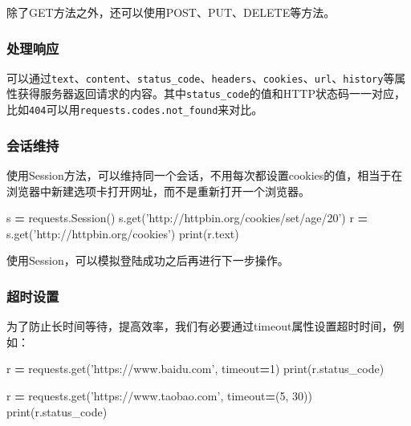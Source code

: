 \documentclass[]{ctexbook}
\newenvironment{Shaded}{\begin{snugshade}}{\end{snugshade}}
\newcommand{\BuiltInTok}[1]{#1}
\newcommand{\DecValTok}[1]{\textcolor[rgb]{0.00,0.00,0.81}{#1}}
\newcommand{\NormalTok}[1]{#1}
\newcommand{\OperatorTok}[1]{\textcolor[rgb]{0.81,0.36,0.00}{\textbf{#1}}}
\newcommand{\StringTok}[1]{\textcolor[rgb]{0.31,0.60,0.02}{#1}}
\begin{document}
除了GET方法之外，还可以使用POST、PUT、DELETE等方法。

\hypertarget{ux5904ux7406ux54cdux5e94}{%
\subsubsection{处理响应}\label{ux5904ux7406ux54cdux5e94}}

可以通过\texttt{text}、\texttt{content}、\texttt{status\_code}、\texttt{headers}、\texttt{cookies}、\texttt{url}、\texttt{history}等属性获得服务器返回请求的内容。其中\texttt{status\_code}的值和HTTP状态码一一对应，比如\texttt{404}可以用\texttt{requests.codes.not\_found}来对比。

\hypertarget{ux4f1aux8bddux7ef4ux6301}{%
\subsubsection{会话维持}\label{ux4f1aux8bddux7ef4ux6301}}

使用Session方法，可以维持同一个会话，不用每次都设置cookies的值，相当于在浏览器中新建选项卡打开网址，而不是重新打开一个浏览器。

\begin{Shaded}
\begin{Highlighting}[]
\NormalTok{s }\OperatorTok{=}\NormalTok{ requests.Session()}
\NormalTok{s.get(}\StringTok{'http://httpbin.org/cookies/set/age/20'}\NormalTok{)}
\NormalTok{r }\OperatorTok{=}\NormalTok{ s.get(}\StringTok{'http://httpbin.org/cookies'}\NormalTok{)}
\BuiltInTok{print}\NormalTok{(r.text)}
\end{Highlighting}
\end{Shaded}

使用Session，可以模拟登陆成功之后再进行下一步操作。

\hypertarget{ux8d85ux65f6ux8bbeux7f6e}{%
\subsubsection{超时设置}\label{ux8d85ux65f6ux8bbeux7f6e}}

为了防止长时间等待，提高效率，我们有必要通过timeout属性设置超时时间，例如：

\begin{Shaded}
\begin{Highlighting}[]
\NormalTok{r }\OperatorTok{=}\NormalTok{ requests.get(}\StringTok{'https://www.baidu.com'}\NormalTok{, timeout}\OperatorTok{=}\DecValTok{1}\NormalTok{)}
\BuiltInTok{print}\NormalTok{(r.status_code)}

\NormalTok{r }\OperatorTok{=}\NormalTok{ requests.get(}\StringTok{'https://www.taobao.com'}\NormalTok{, timeout}\OperatorTok{=}\NormalTok{(}\DecValTok{5}\NormalTok{, }\DecValTok{30}\NormalTok{))}
\BuiltInTok{print}\NormalTok{(r.status_code)}
\end{Highlighting}
\end{Shaded}
\end{document}
